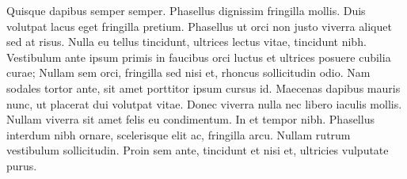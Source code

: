 \vspace{2mm}

Quisque dapibus semper semper. Phasellus dignissim fringilla mollis. Duis volutpat lacus eget fringilla pretium. Phasellus ut orci non justo viverra aliquet sed at risus. Nulla eu tellus tincidunt, ultrices lectus vitae, tincidunt nibh. Vestibulum ante ipsum primis in faucibus orci luctus et ultrices posuere cubilia curae; Nullam sem orci, fringilla sed nisi et, rhoncus sollicitudin odio. Nam sodales tortor ante, sit amet porttitor ipsum cursus id. Maecenas dapibus mauris nunc, ut placerat dui volutpat vitae. Donec viverra nulla nec libero iaculis mollis. Nullam viverra sit amet felis eu condimentum. In et tempor nibh. Phasellus interdum nibh ornare, scelerisque elit ac, fringilla arcu. Nullam rutrum vestibulum sollicitudin. Proin sem ante, tincidunt et nisi et, ultricies vulputate purus.
